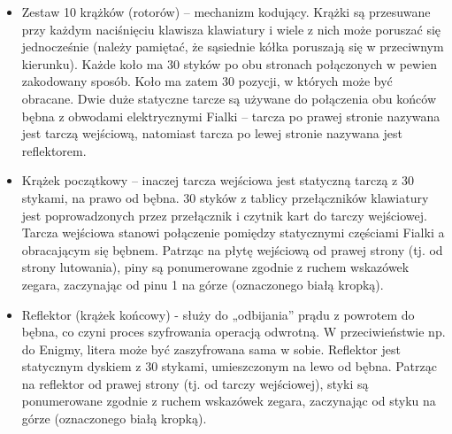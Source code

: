 \documentclass{article}
\begin{document}
\begin{itemize}
\item Zestaw 10 krążków (rotorów) – mechanizm kodujący. Krążki są przesuwane przy każdym naciśnięciu klawisza klawiatury i wiele z nich może poruszać się jednocześnie (należy pamiętać, że sąsiednie kółka poruszają się w przeciwnym kierunku). Każde koło ma 30 styków po obu stronach połączonych w pewien zakodowany sposób. Koło ma zatem 30 pozycji, w których może być obracane. Dwie duże statyczne tarcze są używane do połączenia obu końców bębna z obwodami elektrycznymi Fialki – tarcza po prawej stronie nazywana jest tarczą wejściową, natomiast tarcza po lewej stronie nazywana jest reflektorem.
\item Krążek początkowy – inaczej tarcza wejściowa jest statyczną tarczą z 30 stykami, na prawo od bębna. 30 styków z tablicy przełączników klawiatury jest poprowadzonych przez przełącznik i czytnik kart do tarczy wejściowej. Tarcza wejściowa stanowi połączenie pomiędzy statycznymi częściami Fialki a obracającym się bębnem. Patrząc na płytę wejściową od prawej strony (tj. od strony lutowania), piny są ponumerowane zgodnie z ruchem wskazówek zegara, zaczynając od pinu 1 na górze (oznaczonego białą kropką).
\item Reflektor (krążek końcowy) - służy do „odbijania” prądu z powrotem do bębna, co czyni proces szyfrowania operacją odwrotną. W przeciwieństwie np. do Enigmy, litera może być zaszyfrowana sama w sobie. Reflektor jest statycznym dyskiem z 30 stykami, umieszczonym na lewo od bębna. Patrząc na reflektor od prawej strony (tj. od tarczy wejściowej), styki są ponumerowane zgodnie z ruchem wskazówek zegara, zaczynając od styku na górze (oznaczonego białą kropką).

\end{itemize}
\end{document}
